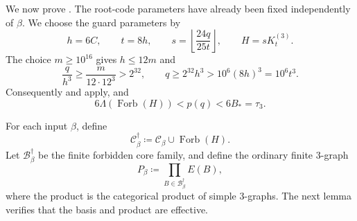 \documentclass[10pt]{article}
\numberwithin{equation}{section}
\theoremstyle{definition}
\newcommand{\Forb}{\operatorname{Forb}}\newcommand{\Ext}{\operatorname{Ext}}
\begin{document}
We now prove . The root-code parameters have already been fixed independently of $\beta$. We choose the guard parameters by
\[
 h=6C,\qquad t=8h,\qquad
 s=\left\lfloor\frac{24q}{25t}\right\rfloor,
 \qquad H=sK_t^{(3)}.
\]
The choice $m\ge10^{16}$ gives $h\le12m$ and
\[
 \frac q{h^3}\ge\frac m{12\cdot12^3}>2^{32},
 \qquad q\ge2^{32}h^3>10^6(8h)^3=10^6t^3.
\]
Consequently  and
 apply, and
\begin{equation}\label{eq:final-singleton-safe-guard}
 6\Lambda(\Forb(H))<p(q)<6B_*=\tau_3.
\end{equation}

For each input $\beta$, define
\[
 \mathcal C^\dagger_\beta
 \coloneqq\mathcal C_\beta\cup\Forb(H).
\]
Let $\mathcal B^\dagger_\beta$ be the finite forbidden core family, and define the ordinary finite $3$-graph
\begin{equation}
 P_\beta
 \coloneqq\prod_{B\in\mathcal B^\dagger_\beta}E(B),
 \label{eq:final-singleton-product}
\end{equation}
where the product is the categorical product of simple $3$-graphs. The next lemma verifies that the basis and product are effective.
\end{document}
